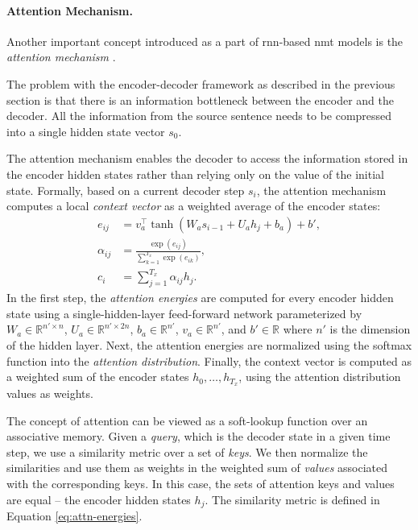 \paragraph{Attention Mechanism.} Another important concept introduced as a part
of \ac{rnn}-based \ac{nmt} models is the \emph{attention mechanism}
\citep{bahdanau2014neural,luong-etal-2015-effective}.

The problem with the encoder-decoder framework as described in the previous
section is that there is an information bottleneck between the encoder and the
decoder. All the information from the source sentence needs to be compressed
into a single hidden state vector $s_0$.

The attention mechanism enables the decoder to access the information stored in
the encoder hidden states rather than relying only on the value of the initial
state.  Formally, based on a current decoder step $s_i$, the attention mechanism
computes a local \emph{context vector} as a weighted average of the encoder
states:
%
\begin{align}
  e_{ij} &= v_a^\top \tanh (W_a s_{i-1} + U_a h_j + b_a) + b', \label{eq:attn-energies} \\
  \alpha_{ij} &= \frac{\exp(e_{ij})}{\sum_{k=1}^{T_x}\exp(e_{ik})}, \\
  c_i &= \sum_{j=1}^{T_x} \alpha_{ij} h_j.
\end{align}
%
In the first step, the \emph{attention energies} are computed for every encoder
hidden state using a single-hidden-layer feed-forward network parameterized by
$W_a \in \mathbb{R}^{n' \times n}$, $U_a \in \mathbb{R}^{n' \times 2n}$,
$b_a \in \mathbb{R}^{n'}$, $v_a \in \mathbb{R}^{n'}$, and $b' \in \mathbb{R}$
where $n'$ is the dimension of the hidden layer. Next, the attention energies
are normalized using the softmax function into the \emph{attention
  distribution}.  Finally, the context vector is computed as a weighted sum of
the encoder states $h_0,\ldots, h_{T_x}$, using the attention distribution
values as weights.

The concept of attention can be viewed as a soft-lookup function over an
associative memory. Given a \emph{query}, which is the decoder state in a given
time step, we use a similarity metric over a set of \emph{keys}. We then
normalize the similarities and use them as weights in the weighted sum of
\emph{values} associated with the corresponding keys. In this case, the sets of
attention keys and values are equal -- the encoder hidden states $h_j$. The
similarity metric is defined in Equation \ref{eq:attn-energies}.

